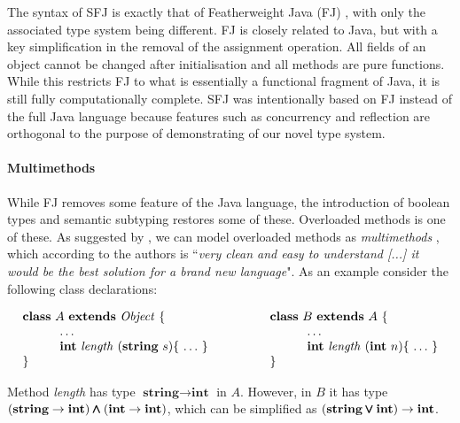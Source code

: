 \documentclass{l4proj}
\begin{document}
The syntax of SFJ is exactly that of Featherweight Java (FJ) \citep{Igarashi1999}, with only the associated type system being different.
FJ is closely related to Java, but with a key simplification in the removal of the assignment operation.
All fields of an object cannot be changed after initialisation and all methods are pure functions.
While this restricts FJ to what is essentially a functional fragment of Java, it is still fully computationally complete.
SFJ was intentionally based on FJ instead of the full Java language because features such as concurrency and reflection are orthogonal to the purpose of demonstrating of our novel type system.

\paragraph{Multimethods}

While FJ removes some feature of the  Java language, the introduction of boolean types and semantic subtyping restores some of these.
Overloaded methods is one of these.
As suggested by \citet{Dardha2017}, we can model overloaded methods as \emph{multimethods} \citep{BC97}, which according to the authors is ``\emph{very clean and easy to understand [...] it would be the best solution for a brand new language}".
As an example \citet{Dardha2013,Dardha2017} consider the following class declarations:

\begin{equation}
    \label{multi1}
    \begin{array}{ll}
        \syndecl{A}{\mathit{Object}} {
         &
            \qquad
            \syndecl{B}{A} {
                \\
                \qquad\quad \ldots \qquad
         &
                \qquad\qquad\quad \ldots
                \\
                \qquad\quad \textbf{int}\ \mathit{length}\ (\textbf{string}\ s)\{\ \ldots\ \}\qquad
         &
                \qquad\qquad\quad \textbf{int}\ \mathit{length}\ (\textbf{int}\ n)\{\ \ldots\ \}
                \\
            }
         &
            \qquad }
    \end{array}
\end{equation}

Method \textit{length} has type $\textbf{string} \rightarrow \textbf{int}$ in $A$.
However, in $B$ it has type $(\textbf{string} \rightarrow \textbf{int}) \pmb{\wedge} (\textbf{int} \rightarrow \textbf{int})$, which can be simplified as $(\textbf{string} \pmb{\vee} \textbf{int}) \rightarrow \textbf{int}$.
\end{document}
